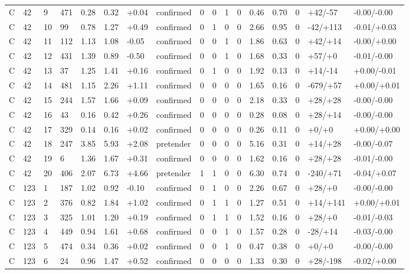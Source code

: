 \documentclass[11pt,a4paper]{article}
\begin{document}
{\begin{longtable}[]{@{}lllllllllllllllll@{}}
C & 42 & 9 & 471 & 0.28 & 0.32 & +0.04 & confirmed & 0 & 0 & 1 & 0 & 0.46 & 0.70 & 0 & +42/-57 & -0.00/-0.00 \\
C & 42 & 10 & 99 & 0.78 & 1.27 & +0.49 & confirmed & 0 & 1 & 0 & 0 & 2.66 & 0.95 & 0 & -42/+113 & -0.01/+0.03 \\
C & 42 & 11 & 112 & 1.13 & 1.08 & -0.05 & confirmed & 0 & 0 & 1 & 0 & 1.86 & 0.63 & 0 & +42/+14 & -0.00/+0.00 \\
C & 42 & 12 & 431 & 1.39 & 0.89 & -0.50 & confirmed & 0 & 0 & 1 & 0 & 1.68 & 0.33 & 0 & +57/+0 & -0.01/-0.00 \\
C & 42 & 13 & 37 & 1.25 & 1.41 & +0.16 & confirmed & 0 & 1 & 0 & 0 & 1.92 & 0.13 & 0 & +14/-14 & +0.00/-0.01 \\
C & 42 & 14 & 481 & 1.15 & 2.26 & +1.11 & confirmed & 0 & 0 & 0 & 0 & 1.65 & 0.16 & 0 & -679/+57 & +0.00/+0.01 \\
C & 42 & 15 & 244 & 1.57 & 1.66 & +0.09 & confirmed & 0 & 0 & 0 & 0 & 2.18 & 0.33 & 0 & +28/+28 & -0.00/-0.00 \\
C & 42 & 16 & 43 & 0.16 & 0.42 & +0.26 & confirmed & 0 & 0 & 0 & 0 & 0.28 & 0.08 & 0 & +28/+14 & -0.00/-0.00 \\
C & 42 & 17 & 329 & 0.14 & 0.16 & +0.02 & confirmed & 0 & 0 & 0 & 0 & 0.26 & 0.11 & 0 & +0/+0 & +0.00/+0.00 \\
C & 42 & 18 & 247 & 3.85 & 5.93 & +2.08 & pretender & 0 & 0 & 0 & 0 & 5.16 & 0.31 & 0 & +14/+28 & -0.00/-0.07 \\
C & 42 & 19 & 6 & 1.36 & 1.67 & +0.31 & confirmed & 0 & 0 & 0 & 0 & 1.62 & 0.16 & 0 & +28/+28 & -0.01/-0.00 \\
C & 42 & 20 & 406 & 2.07 & 6.73 & +4.66 & pretender & 1 & 1 & 0 & 0 & 6.30 & 0.74 & 0 & -240/+71 & -0.04/+0.07 \\
C & 123 & 1 & 187 & 1.02 & 0.92 & -0.10 & confirmed & 0 & 1 & 0 & 0 & 2.26 & 0.67 & 0 & +28/+0 & -0.00/-0.00 \\
C & 123 & 2 & 376 & 0.82 & 1.84 & +1.02 & confirmed & 0 & 1 & 1 & 0 & 1.27 & 0.51 & 0 & +14/+141 & +0.00/+0.01 \\
C & 123 & 3 & 325 & 1.01 & 1.20 & +0.19 & confirmed & 0 & 1 & 1 & 0 & 1.52 & 0.16 & 0 & +28/+0 & -0.01/-0.03 \\
C & 123 & 4 & 449 & 0.94 & 1.61 & +0.68 & confirmed & 0 & 0 & 1 & 0 & 1.57 & 0.28 & 0 & -28/+14 & -0.03/-0.00 \\
C & 123 & 5 & 474 & 0.34 & 0.36 & +0.02 & confirmed & 0 & 0 & 1 & 0 & 0.47 & 0.38 & 0 & +0/+0 & -0.00/-0.00 \\
C & 123 & 6 & 24 & 0.96 & 1.47 & +0.52 & confirmed & 0 & 0 & 0 & 0 & 1.33 & 0.30 & 0 & +28/-198 & -0.02/+0.00 \\

\end{longtable}}
\end{document}
